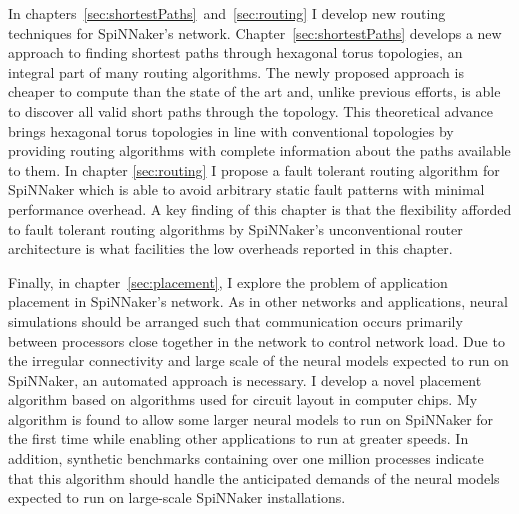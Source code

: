 In chapters~\ref{sec:shortestPaths}~and~\ref{sec:routing} I develop new routing
techniques for SpiNNaker's network. Chapter~\ref{sec:shortestPaths} develops a
new approach to finding shortest paths through hexagonal torus topologies, an
integral part of many routing algorithms. The newly proposed approach is
cheaper to compute than the state of the art and, unlike previous efforts, is
able to discover all valid short paths through the topology. This theoretical
advance brings hexagonal torus topologies in line with conventional topologies
by providing routing algorithms with complete information about the paths
available to them. In chapter \ref{sec:routing} I propose a fault tolerant
routing algorithm for SpiNNaker which is able to avoid arbitrary static fault
patterns with minimal performance overhead. A key finding of this chapter is
that the flexibility afforded to fault tolerant routing algorithms by
SpiNNaker's unconventional router architecture is what facilities the low
overheads reported in this chapter.

Finally, in chapter~\ref{sec:placement}, I explore the problem of application
placement in SpiNNaker's network. As in other networks and applications, neural
simulations should be arranged such that communication occurs primarily between
processors close together in the network to control network load. Due to the
irregular connectivity and large scale of the neural models expected to run on
SpiNNaker, an automated approach is necessary. I develop a novel placement
algorithm based on algorithms used for circuit layout in computer chips. My
algorithm is found to allow some larger neural models to run on SpiNNaker for
the first time while enabling other applications to run at greater speeds. In
addition, synthetic benchmarks containing over one million processes indicate
that this algorithm should handle the anticipated demands of the neural models
expected to run on large-scale SpiNNaker installations.
